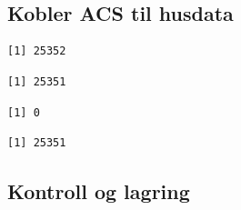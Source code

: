 \documentclass[
  norsk,
  a4paper,
]{article}
\begin{document}
\begin{verbatim}
                    
                    
\end{verbatim}

\subsection{Kobler ACS til husdata}\label{kobler-acs-til-husdata}

\begin{verbatim}
[1] 25352
\end{verbatim}

\begin{verbatim}
[1] 25351
\end{verbatim}

\begin{verbatim}
[1] 0
\end{verbatim}

\begin{verbatim}
[1] 25351
\end{verbatim}

\subsection{Kontroll og lagring}\label{kontroll-og-lagring}
\end{document}
